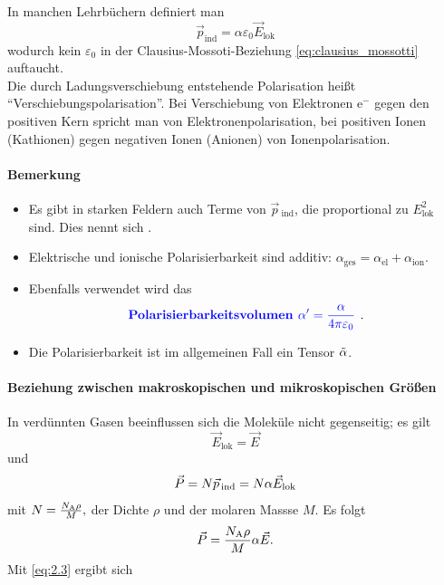     In manchen Lehrbüchern definiert man
    $$
    \vec{p}_{\text{ind}} = \alpha \varepsilon_0 \vec{E}_{\text{lok}}
    $$ 
    wodurch kein $ \varepsilon_0$ in der Clausius-Mossoti-Beziehung \eqref{eq:clausius_mossotti} auftaucht.\\
    
    Die durch Ladungsverschiebung entstehende Polarisation heißt \enquote{Verschiebungspolarisation}. Bei Verschiebung von Elektronen $\mathrm{e}^{-}$ gegen den positiven Kern spricht man von Elektronenpolarisation, bei positiven Ionen (Kathionen) gegen negativen Ionen (Anionen) von Ionenpolarisation.

\paragraph{Bemerkung}
    \begin{itemize}
    	\item Es gibt in starken Feldern auch Terme von $\vec{p}\,_{\text{ind}}$, die proportional zu $E^2_{\text{lok}}$ sind. Dies nennt sich .
    	\item Elektrische und ionische Polarisierbarkeit sind additiv: $\alpha_\text{ges} = \alpha_{\text{el}} + \alpha_{\text{ion}}$. 
    	\item Ebenfalls verwendet wird das $$\textbf{\textcolor{blue}{Polarisierbarkeitsvolumen $\alpha'= \frac{ \alpha}{4 \pi \varepsilon_0}$ }}.$$
    	\item Die Polarisierbarkeit ist im allgemeinen Fall ein Tensor $\tilde{ \alpha}$.
    \end{itemize}

\paragraph{Beziehung zwischen makroskopischen und mikroskopischen Größen}
    In verdünnten Gasen beeinflussen sich die Moleküle nicht gegenseitig; es gilt
    $$
    \vec{E}_{\text{lok}} = \vec{E}
    $$
    und
    \begin{equation}
    	\label{2.8}
    	\vec{P} = N \vec{p}_{\text{\,ind}} = N \alpha \vec{E}_{\text{lok}}
    \end{equation}
    mit
    $
    N = \frac{N_\mathrm{A} \rho}{M},
    $
    der Dichte $\rho$ und der molaren Massse $M$. Es folgt
    \begin{equation}
    	\vec{P} = \frac{N_\mathrm{A} \rho}{M} \alpha \vec{E}.
        \label{eq:2.10}
    \end{equation}
    Mit \ref{eq:2.3} ergibt sich
    
